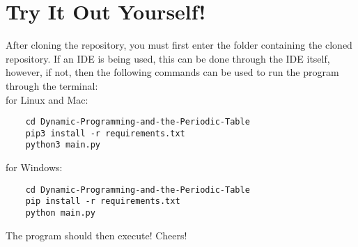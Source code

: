 
\section{Try It Out Yourself!}

After cloning the repository, you must first enter the folder containing the cloned repository. If an IDE is being used, this can be done through the IDE itself, however, if not, then the following commands can be used to run the program through the terminal: \\ 

for Linux and Mac:
\begin{verbatim}
    cd Dynamic-Programming-and-the-Periodic-Table
    pip3 install -r requirements.txt
    python3 main.py    
\end{verbatim}

for Windows:
\begin{verbatim}
    cd Dynamic-Programming-and-the-Periodic-Table
    pip install -r requirements.txt
    python main.py
\end{verbatim}

The program should then execute! Cheers!